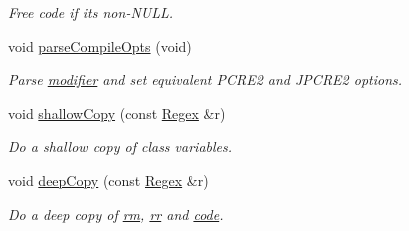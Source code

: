 \begin{DoxyCompactItemize}
\begin{DoxyCompactList}\small\item\em Free code if it\textquotesingle{}s non-\/\+N\+U\+LL. \end{DoxyCompactList}\item 
void \hyperlink{classjpcre2_1_1Regex_a0430f0a7643258cba9dc1c29ad3bc31e}{parse\+Compile\+Opts} (void)
\begin{DoxyCompactList}\small\item\em Parse \hyperlink{classjpcre2_1_1Regex_ab4447726c0cedd7868a600ea7db876a8}{modifier} and set equivalent P\+C\+R\+E2 and J\+P\+C\+R\+E2 options. \end{DoxyCompactList}\item 
void \hyperlink{classjpcre2_1_1Regex_a24594d3bdb08b3795080c68019928f3a}{shallow\+Copy} (const \hyperlink{classjpcre2_1_1Regex}{Regex} \&r)\hypertarget{classjpcre2_1_1Regex_a24594d3bdb08b3795080c68019928f3a}{}\label{classjpcre2_1_1Regex_a24594d3bdb08b3795080c68019928f3a}

\begin{DoxyCompactList}\small\item\em Do a shallow copy of class variables. \end{DoxyCompactList}\item 
void \hyperlink{classjpcre2_1_1Regex_acaa5da5fc3ad903e3ecc724750214e07}{deep\+Copy} (const \hyperlink{classjpcre2_1_1Regex}{Regex} \&r)
\begin{DoxyCompactList}\small\item\em Do a deep copy of \hyperlink{classjpcre2_1_1Regex_a447925705d222dbbd8c7d60b98cc65f0}{rm}, \hyperlink{classjpcre2_1_1Regex_a5a7ac6c6288988079b8933b4b6637fab}{rr} and \hyperlink{classjpcre2_1_1Regex_a2742264206d8976c413b474b7bac4b2e}{code}. \end{DoxyCompactList}\end{DoxyCompactItemize}
